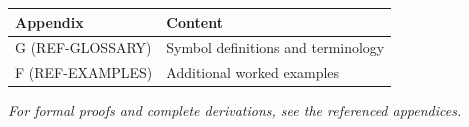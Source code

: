 \begin{tcolorbox}[
    colback=yellow!10!white,
    colframe=orange!75!black,
    title={\textbf{Appendix References for This Chapter}},
    fonttitle=\bfseries
]
\small
\begin{tabular}{@{}lp{8cm}@{}}
\textbf{Appendix} & \textbf{Content} \\
\midrule
G (REF-GLOSSARY) & Symbol definitions and terminology \\
F (REF-EXAMPLES) & Additional worked examples \\
\end{tabular}

\medskip
\textit{For formal proofs and complete derivations, see the referenced appendices.}
\end{tcolorbox}

